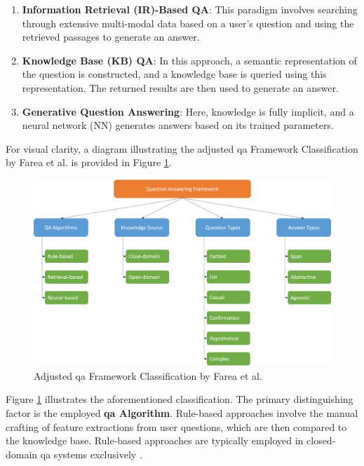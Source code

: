 \begin{enumerate}
    \item \textbf{Information Retrieval (IR)-Based QA}: This paradigm involves searching through extensive multi-modal data based on a user's question and using the retrieved passages to generate an answer.
    
    \item \textbf{Knowledge Base (KB) QA}: In this approach, a semantic representation of the question is constructed, and a knowledge base is queried using this representation. The returned results are then used to generate an answer.
    
    \item \textbf{Generative Question Answering}: Here, knowledge is fully implicit, and a neural network (NN) generates answers based on its trained parameters.
\end{enumerate}

For visual clarity, a diagram illustrating the adjusted \gls{qa} Framework Classification by Farea et al. is provided in Figure \ref{fig:qa_classification}.

\begin{figure}
    \centering
    \includegraphics[width=\textwidth]{Grafiken/QA_Framework.png}
    \caption{Adjusted \gls{qa} Framework Classification by Farea et al. \cite{farea_evaluation_2022}}
    \label{fig:qa_classification}
\end{figure}


Figure \ref{fig:qa_classification} illustrates the aforementioned classification. The primary distinguishing factor is the employed \textbf{\gls{qa} Algorithm}. Rule-based approaches involve the manual crafting of feature extractions from user questions, which are then compared to the knowledge base. Rule-based approaches are typically employed in closed-domain \gls{qa} systems exclusively \cite{etezadi_state_2023}.

